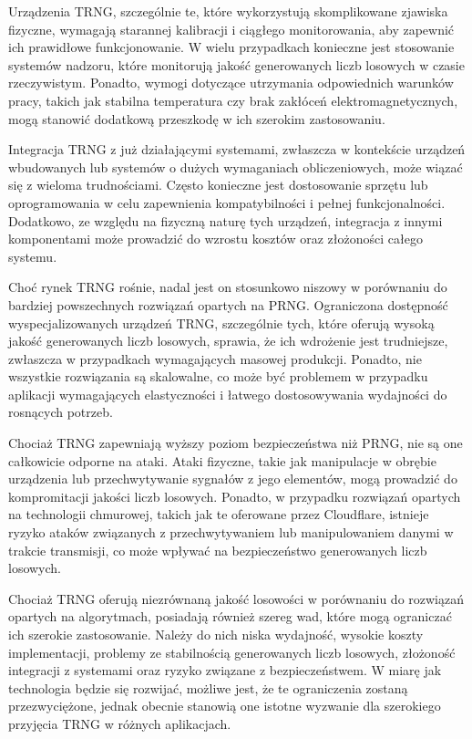 Urządzenia TRNG, szczególnie te, które wykorzystują skomplikowane zjawiska fizyczne, wymagają starannej kalibracji i ciągłego monitorowania,
aby zapewnić ich prawidłowe funkcjonowanie. W wielu przypadkach konieczne jest stosowanie systemów nadzoru,
które monitorują jakość generowanych liczb losowych w czasie rzeczywistym.
Ponadto, wymogi dotyczące utrzymania odpowiednich warunków pracy, takich jak stabilna temperatura czy brak zakłóceń elektromagnetycznych,
mogą stanowić dodatkową przeszkodę w ich szerokim zastosowaniu.


Integracja TRNG z już działającymi systemami, zwłaszcza w kontekście urządzeń wbudowanych lub systemów o dużych wymaganiach obliczeniowych,
może wiązać się z wieloma trudnościami.
Często konieczne jest dostosowanie sprzętu lub oprogramowania w celu zapewnienia kompatybilności i pełnej funkcjonalności.
Dodatkowo, ze względu na fizyczną naturę tych urządzeń,
integracja z innymi komponentami może prowadzić do wzrostu kosztów oraz złożoności całego systemu.


Choć rynek TRNG rośnie, nadal jest on stosunkowo niszowy w porównaniu do bardziej powszechnych rozwiązań opartych na PRNG.
Ograniczona dostępność wyspecjalizowanych urządzeń TRNG, szczególnie tych, które oferują wysoką jakość generowanych liczb losowych,
sprawia, że ich wdrożenie jest trudniejsze, zwłaszcza w przypadkach wymagających masowej produkcji.
Ponadto, nie wszystkie rozwiązania są skalowalne, co może być problemem w przypadku aplikacji
wymagających elastyczności i łatwego dostosowywania wydajności do rosnących potrzeb.


Chociaż TRNG zapewniają wyższy poziom bezpieczeństwa niż PRNG, nie są one całkowicie odporne na ataki.
Ataki fizyczne, takie jak manipulacje w obrębie urządzenia lub przechwytywanie sygnałów z jego elementów,
mogą prowadzić do kompromitacji jakości liczb losowych.
Ponadto, w przypadku rozwiązań opartych na technologii chmurowej,
takich jak te oferowane przez Cloudflare, istnieje ryzyko ataków związanych z przechwytywaniem lub
manipulowaniem danymi w trakcie transmisji, co może wpływać na bezpieczeństwo generowanych liczb losowych.


Chociaż TRNG oferują niezrównaną jakość losowości w porównaniu do rozwiązań opartych na algorytmach,
posiadają również szereg wad, które mogą ograniczać ich szerokie zastosowanie.
Należy do nich niska wydajność, wysokie koszty implementacji, problemy ze stabilnością generowanych liczb losowych,
złożoność integracji z systemami oraz ryzyko związane z bezpieczeństwem. W miarę jak technologia będzie się rozwijać,
możliwe jest, że te ograniczenia zostaną przezwyciężone,
jednak obecnie stanowią one istotne wyzwanie dla szerokiego przyjęcia TRNG w różnych aplikacjach.


\fi